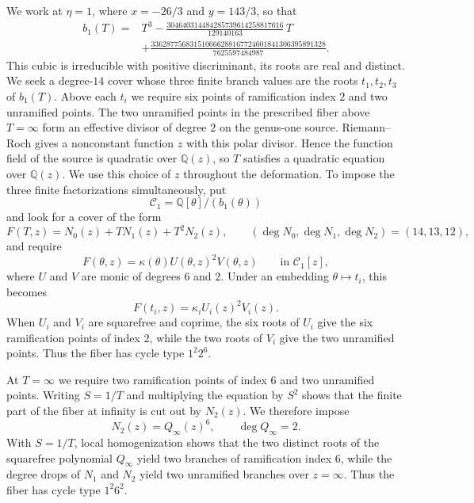 \documentclass[10pt]{amsart}
\numberwithin{equation}{section}
\theoremstyle{definition}
\theoremstyle{remark}
\newcommand{\Q}{\mathbb{Q}}
\begin{document}
We work at $\eta=1$, where $x=-26/3$ and $y=143/3$, so that
\begin{equation*}
\begin{split}
 b_1(T)={}&T^3
 -\frac{304640314484285739614258817616}{129140163}\,T\\
 &+\frac{336287756831510666288167724601841306395891328}
        {7625597484987} .
\end{split}
\end{equation*}
This cubic is irreducible with positive discriminant, its roots are real
and distinct.    We seek a degree-$14$ cover whose three finite branch values are the
  roots $t_1,t_2,t_3$ of $b_1(T)$.  Above each $t_i$ we require six points of
  ramification index $2$ and two unramified points. The two unramified points
  in the prescribed fiber above $T=\infty$ form an effective divisor of
  degree $2$ on the genus-one source. Riemann--Roch gives a nonconstant
  function $z$ with this polar divisor. Hence the function field of the
  source is quadratic over $\Q(z)$, so $T$ satisfies a quadratic equation
  over $\Q(z)$. We use this choice of $z$ throughout the deformation. To
  impose the three finite factorizations simultaneously, put
  \[
   \mathcal C_1=\Q[\theta]/(b_1(\theta))
  \]
  and look for a cover of the form
  \begin{equation}\label{eq:l13-family}
 F(T,z)=N_0(z)+TN_1(z)+T^2N_2(z),
 \qquad
 (\deg N_0,\deg N_1,\deg N_2)=(14,13,12),
\end{equation}
  and require
  \[
   F(\theta,z)=\kappa(\theta)U(\theta,z)^2V(\theta,z)
   \qquad\text{in }\mathcal C_1[z],
  \]
  where $U$ and $V$ are monic of degrees $6$ and $2$.  Under an embedding
  $\theta\mapsto t_i$, this becomes
  \[
   F(t_i,z)=\kappa_iU_i(z)^2V_i(z).
  \]
  When $U_i$ and $V_i$ are squarefree and coprime, the six roots of $U_i$
  give the six ramification points of index $2$, while the two roots of
  $V_i$ give the two unramified points.  Thus the fiber has cycle type
  $1^2 2^6$.

  At $T=\infty$ we require two ramification points of index $6$ and two
  unramified points.  Writing $S=1/T$ and multiplying the equation by $S^2$
  shows that the finite part of the fiber at infinity is cut out by
  $N_2(z)$.  We therefore impose
\begin{equation}\label{eq:l13-infinity-factorization}
       N_2(z)=Q_\infty(z)^6,\qquad \deg Q_\infty=2.
\end{equation}
With $S=1/T$, local homogenization shows that the two distinct roots of the
squarefree polynomial $Q_\infty$ yield two branches of ramification index
$6$, while the degree drops of $N_1$ and $N_2$ yield two unramified branches
over $z=\infty$. Thus the fiber has cycle type $1^2 6^2$.
\end{document}
